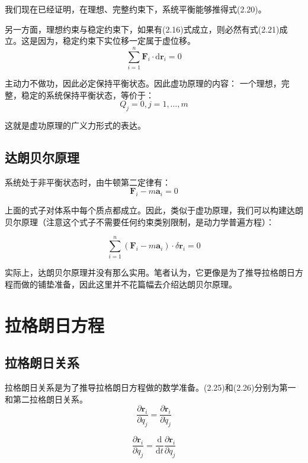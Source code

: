 \documentclass[a4paper, 10pt, openany]{book}%
\begin{document}
   我们现在已经证明，在理想、完整约束下，系统平衡能够推得式(2.20)。

   另一方面，理想约束与稳定约束下，如果有(2.16)式成立，则必然有式(2.21)成立。这是因为，稳定约束下实位移一定属于虚位移。
   \begin{equation}
  \sum_{i=1}^n \textbf{F}_i \cdot\mathrm{d} \textbf{r}_i=0
  \end{equation}
   
   主动力不做功，因此必定保持平衡状态。因此虚功原理的内容：
   一个理想，完整，稳定的系统保持平衡状态，等价于：
   \begin{equation}
    Q_j=0,j=1,\dots,m
   \end{equation}

   这就是虚功原理的广义力形式的表达。
   
   \subsection{达朗贝尔原理}
   系统处于非平衡状态时，由牛顿第二定律有：
   \begin{equation}
   \textbf{F}_i-m\textbf{a}_i=0
   \end{equation}

   上面的式子对体系中每个质点都成立。因此，类似于虚功原理，我们可以构建达朗贝尔原理（注意这个式子不需要任何约束类别限制，是动力学普遍方程）：
    
    \begin{equation}
    \sum_{i=1}^n (\textbf{F}_i-m\textbf{a}_i)\cdot \delta \textbf{r}_i=0
    \end{equation}
    
实际上，达朗贝尔原理并没有那么实用。笔者认为，它更像是为了推导拉格朗日方程而做的铺垫准备，因此这里并不花篇幅去介绍达朗贝尔原理。


    \section{拉格朗日方程}
    \subsection{拉格朗日关系}
    拉格朗日关系是为了推导拉格朗日方程做的数学准备。(2.25)和(2.26)分别为第一和第二拉格朗日关系。
    \begin{equation}
        \frac{\partial \textbf{r}_i}{\partial q_j}=\frac{\partial \dot{\textbf{r}}_i}{\partial \dot{q}_j}
    \end{equation}
    
    \begin{equation}
        \frac{\partial \dot{\textbf{r}}_i}{\partial q_j}=\frac{\mathrm{d}}{\mathrm{d}t}\frac{\partial \textbf{r}_i}{\partial q_j}
    \end{equation}
\end{document}

